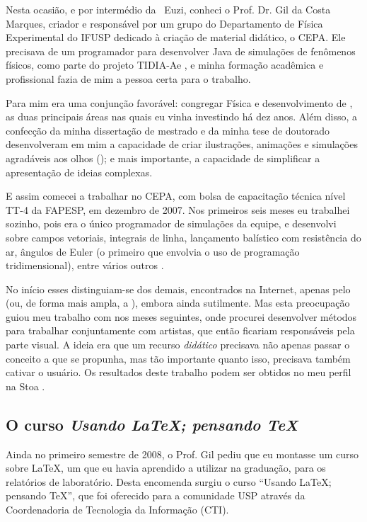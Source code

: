 Nesta ocasião, e por intermédio da \profa\ Euzi, conheci o Prof. Dr. Gil da Costa Marques, criador e responsável por um grupo do Departamento de Física Experimental do IFUSP dedicado à criação de material didático, o CEPA. Ele precisava de um programador para desenvolver  Java de simulações de fenômenos físicos, como parte do projeto TIDIA-Ae \cite{tidia}, e minha formação acadêmica e profissional fazia de mim a pessoa certa para o trabalho.

Para mim era uma conjunção favorável: congregar Física e desenvolvimento de , as duas principais áreas nas quais eu vinha investindo há dez anos. Além disso, a confecção da minha dissertação de mestrado e da minha tese de doutorado desenvolveram em mim a capacidade de criar ilustrações, animações e simulações agradáveis aos olhos (); e mais importante, a capacidade de simplificar a apresentação de ideias complexas.

E assim comecei a trabalhar no CEPA, com bolsa de capacitação técnica nível TT-4 da FAPESP, em dezembro de 2007. Nos primeiros seis meses eu trabalhei sozinho, pois era o único programador de simulações da equipe, e desenvolvi  sobre campos vetoriais, integrais de linha, lançamento balístico com resistência do ar, ângulos de Euler (o primeiro que envolvia o uso de programação tridimensional), entre vários outros \cite{applets}.

No início esses  distinguiam-se dos demais, encontrados na Internet, apenas pelo  (ou, de forma mais ampla, a ), embora ainda sutilmente. Mas esta preocupação guiou meu trabalho com  nos meses seguintes, onde procurei desenvolver métodos para trabalhar conjuntamente com artistas, que então ficariam responsáveis pela parte visual. A ideia era que um recurso \emph{didático} precisava não apenas passar o conceito a que se propunha, mas tão importante quanto isso, precisava também cativar o usuário. Os resultados deste trabalho podem ser obtidos no meu perfil na  Stoa \cite{irpagnossin-stoa}.

\subsection{O curso \textsl{Usando \LaTeX; pensando \TeX}}
\label{sec:latex}

Ainda no primeiro semestre de 2008, o Prof. Gil pediu que eu montasse um curso sobre \LaTeX, um  que eu havia aprendido a utilizar na graduação, para os relatórios de laboratório. Desta encomenda surgiu o curso ``Usando \LaTeX; pensando \TeX'', que foi oferecido para a comunidade USP através da Coordenadoria de Tecnologia da Informação (CTI).

